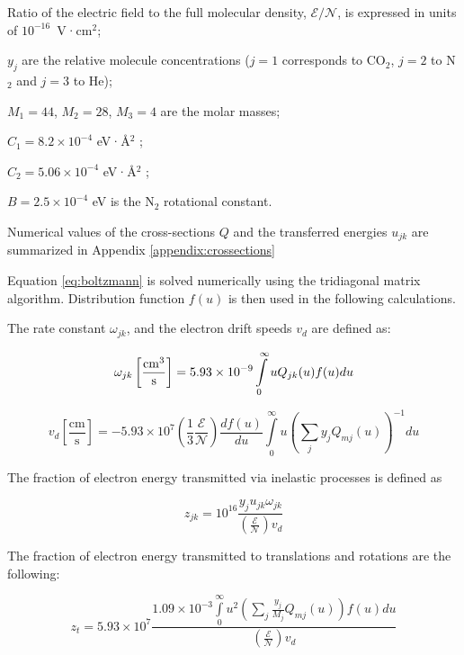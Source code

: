 \documentclass{report}
\begin{document}
Ratio of the electric field to the full molecular density, $\mathcal{E}/\mathcal{N}$, is expressed in units of $10^{-16}$~V·cm$^2$;

$y_j$ are the relative molecule concentrations ($j=1$ corresponds to CO$_2$, $j=2$ to N$_2$ and $j=3$ to He);

$M_1=44$, $M_2=28$, $M_3=4$ are the molar masses;

$C_1 = 8.2 \times 10^{-4}$ eV·Å$^2$ \cite{Hake-1967};

$C_2 = 5.06 \times 10^{-4}$ eV·Å$^2$ \cite{Frost-1962};

$B = 2.5 \times 10^{-4}$ eV is the N$_2$ rotational constant.

Numerical values of the cross-sections $Q$ and the transferred energies $u_{jk}$ are summarized in Appendix \ref{appendix:crossections} 

Equation \ref{eq:boltzmann} is solved numerically using the tridiagonal matrix algorithm. Distribution function $f(u)$ is then used in the following calculations.

The rate constant $\omega_{jk}$, and the electron drift speeds $v_d$ are defined as:

\begin{equation}\label{eq:omega_jk}
\omega _{jk}\left[\frac{\rm{cm}^3}{\text{s}} \right] = 5.93 \times 10^{-9}\int\limits_0^\infty u Q_{jk}(u)f(u)du
\end{equation}
     
\begin{equation}\label{eq:v_d}
v_d \left[ \frac{\text{cm}}{\text{s}} \right] =  - 5.93 \times 10^7 \left( \frac{1}{3}\frac{\mathcal{E}}{\mathcal{N}} \right)\frac{df(u)}{du} \int\limits_0^\infty u \left( \sum\limits_j y_j Q_{mj}(u) \right)^{-1} du
\end{equation}

The fraction of electron energy transmitted via inelastic processes is defined as

\begin{equation}\label{eq:z_jk}
z_{jk} = 10^{16} \frac{y_j u_{jk} \omega _{jk}} {\left( \frac{\mathcal{E}}{\mathcal{N}} \right) v_d}   
\end{equation}

The fraction of electron energy transmitted to translations and rotations are the following:

\begin{equation}\label{eq:z_t}
z_t = 5.93 \times 10^7 \frac{1.09 \times 10^{-3} \int\limits_0^\infty u^2 \left( \sum\limits_j \frac{y_j}{M_j} Q_{mj}(u) \right)f(u)du} {\left( \frac{\mathcal{E}}{\mathcal{N}} \right) v_d}
\end{equation}
\end{document}
